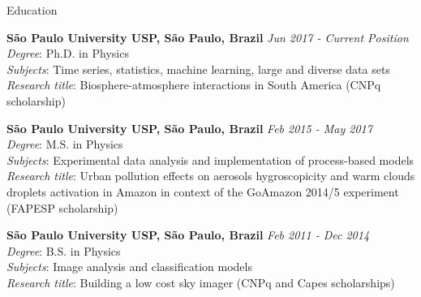 \documentclass{resume} %
\begin{document}

\begin{rSection}{Education}

{\bf São Paulo University USP, São Paulo, Brazil} \hfill {\em Jun 2017 - Current Position} \\
\textit{Degree}: Ph.D. in Physics \\
\textit{Subjects}: Time series, statistics, machine learning, large and diverse data sets  \\
\textit{Research title}: Biosphere-atmosphere interactions in South America (CNPq scholarship)

{\bf São Paulo University USP, São Paulo, Brazil} \hfill {\em Feb 2015 - May 2017} \\
\textit{Degree}: M.S. in Physics \\
\textit{Subjects}: Experimental data analysis and implementation of process-based models \\
\textit{Research title}: Urban pollution effects on aerosols hygroscopicity and warm clouds droplets activation in Amazon in context of the GoAmazon 2014/5 experiment (FAPESP scholarship) 

{\bf São Paulo University USP, São Paulo, Brazil} \hfill {\em Feb 2011 - Dec 2014} \\
\textit{Degree}: B.S. in Physics \\
\textit{Subjects}: Image analysis and classification models \\
\textit{Research title}: Building a low cost sky imager (CNPq and Capes scholarships) 

\end{rSection}

\end{document}
